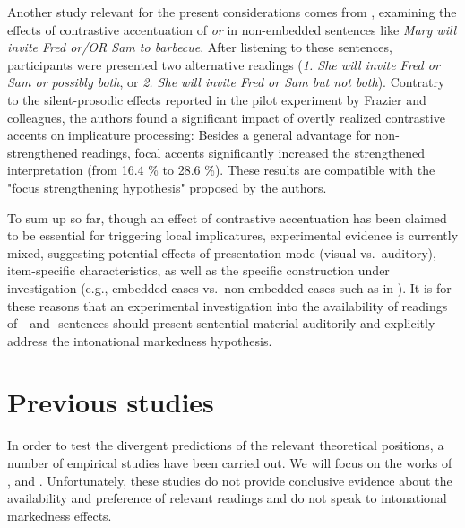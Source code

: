 \documentclass[fleqn,reqno,10pt,draft]{article}
\newcommand{\as}{\acro{as}}
\renewcommand{\es}{\acro{es}}
\begin{document}
Another study relevant for the present considerations comes from
\citet{SchwarzClifton2008:Strengthening-o}, examining the effects of
contrastive accentuation of \emph{or} in non-embedded sentences like
{\it Mary will invite Fred or/OR Sam to barbecue}. After listening to
these sentences, participants were presented two alternative readings
({\it 1. She will invite Fred or Sam or possibly both}, or {\it 2.
  She will invite Fred or Sam but not both}). Contratry to the
silent-prosodic effects reported in the pilot experiment by Frazier
and colleagues, the authors found a significant impact of overtly
realized contrastive accents on implicature processing: Besides a
general advantage for non-strengthened readings, focal accents
significantly increased the strengthened interpretation (from 16.4 \%
to 28.6 \%). These results are compatible with the "focus
strengthening hypothesis" proposed by the authors.

To sum up so far, though an effect of contrastive accentuation has
been claimed to be essential for triggering local implicatures,
experimental evidence is currently mixed, suggesting potential effects
of presentation mode (visual vs.~auditory), item-specific
characteristics, as well as the specific construction under
investigation (e.g., embedded cases vs.~non-embedded cases such as in
\citet{SchwarzClifton2008:Strengthening-o}). It is for these reasons
that an experimental investigation into the availability of readings
of \as- and \es-sentences should present sentential material
auditorily and explicitly address the intonational markedness
hypothesis. 

\section{Previous studies}
\label{sec:previous-studies}

In order to test the divergent predictions of the relevant theoretical
positions, a number of empirical studies have been carried out. We
will focus on the works of
\citet{GeurtsPouscoulous2009:Embedded-Implic},
\citet{CliftonDube2010:Embedded-Implic} and
\citet{ChemlaSpector2010:Experimental-Ev}. Unfortunately, these
studies do not provide conclusive evidence about the availability and
preference of relevant readings and do not speak to intonational
markedness effects.

\subsection{\citet{GeurtsPouscoulous2009:Embedded-Implic}}
\label{sec:Geurts-and-Pouscoulous}
\end{document}
